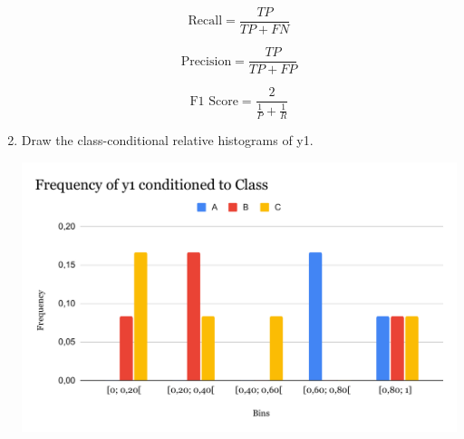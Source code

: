 \documentclass{article}
\begin{document}
\begin{enumerate}[leftmargin=\labelsep]
\large{
\begin{minipage}[]{0.3\textwidth}
  \begin{equation*}
    \text{Recall} = \frac{TP}{TP + FN}
  \end{equation*}
\end{minipage}
\begin{minipage}[]{0.3\textwidth}
  \begin{equation*}
    \text{Precision} = \frac{TP}{TP + FP}
  \end{equation*}
\end{minipage}
\begin{minipage}[]{0.3\textwidth}
  \begin{equation*}
    \text{F1 Score} = \frac{2}{\frac{1}{P}+\frac{1}{R}}
  \end{equation*}
\end{minipage}
}

\vspace{3pt}

\vspace{10pt}



\item Draw the class-conditional relative histograms of y1.

\includegraphics[scale = 0.45, center]{img/histogram1_4.pdf}


\end{enumerate}
\end{document}
